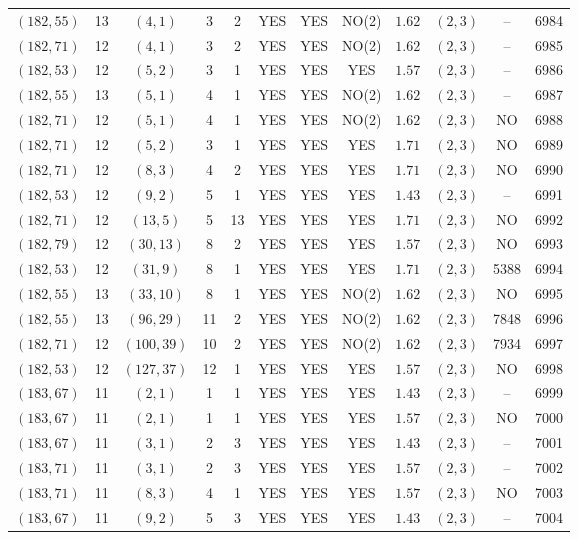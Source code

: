 \begin{longtable}{|c|c|c|c|c|c|c|c|c|c|c|c|}
$(182,55)$ & 13 & $(4,1)$ & 3 & 2 & YES & YES & NO(2) & $1.62$ & $(2,3)$ & -- & 6984\\
$(182,71)$ & 12 & $(4,1)$ & 3 & 2 & YES & YES & NO(2) & $1.62$ & $(2,3)$ & -- & 6985\\
$(182,53)$ & 12 & $(5,2)$ & 3 & 1 & YES & YES & YES & $1.57$ & $(2,3)$ & -- & 6986\\
$(182,55)$ & 13 & $(5,1)$ & 4 & 1 & YES & YES & NO(2) & $1.62$ & $(2,3)$ & -- & 6987\\
$(182,71)$ & 12 & $(5,1)$ & 4 & 1 & YES & YES & NO(2) & $1.62$ & $(2,3)$ & NO & 6988\\
$(182,71)$ & 12 & $(5,2)$ & 3 & 1 & YES & YES & YES & $1.71$ & $(2,3)$ & NO & 6989\\
$(182,71)$ & 12 & $(8,3)$ & 4 & 2 & YES & YES & YES & $1.71$ & $(2,3)$ & NO & 6990\\
$(182,53)$ & 12 & $(9,2)$ & 5 & 1 & YES & YES & YES & $1.43$ & $(2,3)$ & -- & 6991\\
$(182,71)$ & 12 & $(13,5)$ & 5 & 13 & YES & YES & YES & $1.71$ & $(2,3)$ & NO & 6992\\
$(182,79)$ & 12 & $(30,13)$ & 8 & 2 & YES & YES & YES & $1.57$ & $(2,3)$ & NO & 6993\\
$(182,53)$ & 12 & $(31,9)$ & 8 & 1 & YES & YES & YES & $1.71$ & $(2,3)$ & 5388 & 6994\\
$(182,55)$ & 13 & $(33,10)$ & 8 & 1 & YES & YES & NO(2) & $1.62$ & $(2,3)$ & NO & 6995\\
$(182,55)$ & 13 & $(96,29)$ & 11 & 2 & YES & YES & NO(2) & $1.62$ & $(2,3)$ & 7848 & 6996\\
$(182,71)$ & 12 & $(100,39)$ & 10 & 2 & YES & YES & NO(2) & $1.62$ & $(2,3)$ & 7934 & 6997\\
$(182,53)$ & 12 & $(127,37)$ & 12 & 1 & YES & YES & YES & $1.57$ & $(2,3)$ & NO & 6998\\
$(183,67)$ & 11 & $(2,1)$ & 1 & 1 & YES & YES & YES & $1.43$ & $(2,3)$ & -- & 6999\\
$(183,67)$ & 11 & $(2,1)$ & 1 & 1 & YES & YES & YES & $1.57$ & $(2,3)$ & NO & 7000\\
$(183,67)$ & 11 & $(3,1)$ & 2 & 3 & YES & YES & YES & $1.43$ & $(2,3)$ & -- & 7001\\
$(183,71)$ & 11 & $(3,1)$ & 2 & 3 & YES & YES & YES & $1.57$ & $(2,3)$ & -- & 7002\\
$(183,71)$ & 11 & $(8,3)$ & 4 & 1 & YES & YES & YES & $1.57$ & $(2,3)$ & NO & 7003\\
$(183,67)$ & 11 & $(9,2)$ & 5 & 3 & YES & YES & YES & $1.43$ & $(2,3)$ & -- & 7004\\

\end{longtable}
